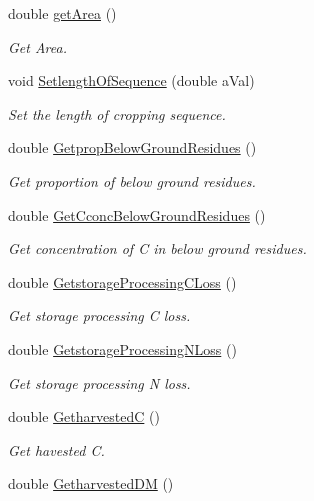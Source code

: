 \begin{DoxyCompactItemize}
double \mbox{\hyperlink{class_crop_class_a77a58c3801353024b26306dc3d170751}{get\+Area}} ()
\begin{DoxyCompactList}\small\item\em Get Area. \end{DoxyCompactList}\item 
void \mbox{\hyperlink{class_crop_class_a9b8b8219ccadb21424f805c5e8bd087a}{Setlength\+Of\+Sequence}} (double a\+Val)
\begin{DoxyCompactList}\small\item\em Set the length of cropping sequence. \end{DoxyCompactList}\item 
double \mbox{\hyperlink{class_crop_class_a6da6484ef8ad9d8b8ea5e65f2ba78a6c}{Getprop\+Below\+Ground\+Residues}} ()
\begin{DoxyCompactList}\small\item\em Get proportion of below ground residues. \end{DoxyCompactList}\item 
double \mbox{\hyperlink{class_crop_class_a07215b0c13fb1c87cef7cbd241fe86ca}{Get\+Cconc\+Below\+Ground\+Residues}} ()
\begin{DoxyCompactList}\small\item\em Get concentration of C in below ground residues. \end{DoxyCompactList}\item 
double \mbox{\hyperlink{class_crop_class_a2b072ca8bcd2b2d08a9a5632a3f0947c}{Getstorage\+Processing\+C\+Loss}} ()
\begin{DoxyCompactList}\small\item\em Get storage processing C loss. \end{DoxyCompactList}\item 
double \mbox{\hyperlink{class_crop_class_ad92df9b839aeed9c78dc7b148fbce8a9}{Getstorage\+Processing\+N\+Loss}} ()
\begin{DoxyCompactList}\small\item\em Get storage processing N loss. \end{DoxyCompactList}\item 
double \mbox{\hyperlink{class_crop_class_a29b529cfa76d83e21ab69dba9d127fdd}{GetharvestedC}} ()
\begin{DoxyCompactList}\small\item\em Get havested C. \end{DoxyCompactList}\item 
double \mbox{\hyperlink{class_crop_class_aacb43bdbade9fa2b4bcb29586dfae7f8}{Getharvested\+DM}} ()

\end{DoxyCompactItemize}
